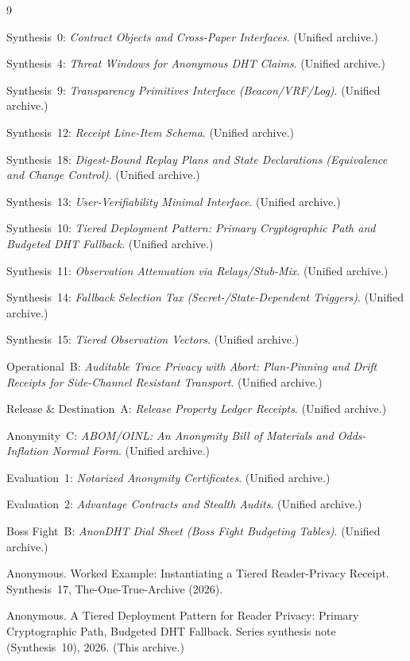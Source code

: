 \documentclass[11pt]{article}
\begin{document}
\begin{thebibliography}{9}

Synthesis~0: \emph{Contract Objects and Cross-Paper Interfaces}. (Unified archive.)

Synthesis~4: \emph{Threat Windows for Anonymous DHT Claims}. (Unified archive.)

Synthesis~9: \emph{Transparency Primitives Interface (Beacon/VRF/Log)}. (Unified archive.)

Synthesis~12: \emph{Receipt Line-Item Schema}. (Unified archive.)

Synthesis~18: \emph{Digest-Bound Replay Plans and State Declarations (Equivalence and Change Control)}. (Unified archive.)

Synthesis~13: \emph{User-Verifiability Minimal Interface}. (Unified archive.)

Synthesis~10: \emph{Tiered Deployment Pattern: Primary Cryptographic Path and Budgeted DHT Fallback}. (Unified archive.)

Synthesis~11: \emph{Observation Attenuation via Relays/Stub-Mix}. (Unified archive.)

Synthesis~14: \emph{Fallback Selection Tax (Secret-/State-Dependent Triggers)}. (Unified archive.)

Synthesis~15: \emph{Tiered Observation Vectors}. (Unified archive.)

Operational~B: \emph{Auditable Trace Privacy with Abort: Plan-Pinning and Drift Receipts for Side-Channel Resistant Transport}. (Unified archive.)

Release \& Destination~A: \emph{Release Property Ledger Receipts}. (Unified archive.)

Anonymity~C: \emph{ABOM/OINL: An Anonymity Bill of Materials and Odds-Inflation Normal Form}. (Unified archive.)

Evaluation~1: \emph{Notarized Anonymity Certificates}. (Unified archive.)

Evaluation~2: \emph{Advantage Contracts and Stealth Audits}. (Unified archive.)

Boss Fight~B: \emph{AnonDHT Dial Sheet (Boss Fight Budgeting Tables)}. (Unified archive.)


Anonymous.
\newblock Worked Example: Instantiating a Tiered Reader-Privacy Receipt.
\newblock Synthesis~17, The-One-True-Archive (2026).


Anonymous.
\newblock A Tiered Deployment Pattern for Reader Privacy: Primary Cryptographic Path, Budgeted DHT Fallback.
\newblock Series synthesis note (Synthesis~10), 2026. (This archive.)

\end{thebibliography}
\end{document}
